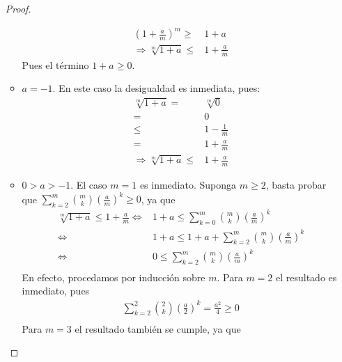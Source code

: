 \documentclass[12pt]{article}
\begin{document}
\begin{enumerate}
\begin{proof}
\begin{itemize}
\begin{equation*}
                \begin{split}
                    \left(1+\frac{a}{m}\right)^m\geq&1+a\\
                    \Rightarrow \sqrt[m]{1+a}\leq&1+\frac{a}{m}
                \end{split}
            \end{equation*}
            Pues el término $1+a\geq0$.
            \item $a=-1$. En este caso la desigualdad es inmediata, pues:
            \begin{equation*}
                \begin{split}
                    \sqrt[m]{1+a}=&\sqrt[m]{0}\\
                    =&0\\
                    \leq& 1-\frac{1}{m}\\
                    =&1+\frac{a}{m}\\
                    \Rightarrow\sqrt[m]{1+a}\leq&1+\frac{a}{m}
                \end{split}
            \end{equation*}
            \item $0> a> -1$. El caso $m=1$ es inmediato. Suponga $m\geq2$, basta probar que $\sum_{k=2}^{m}{m \choose k}\left(\frac{a}{m}\right)^k\geq 0$, ya que
            \begin{equation*}
                \begin{split}
                    \sqrt[m]{1+a}\leq 1+\frac{a}{m}\iff&1+a\leq \sum_{k=0}^{m}{m \choose k}\left(\frac{a}{m}\right)^k\\
                    \iff&1+a\leq1+a+\sum_{k=2}^{m}{m \choose k}\left(\frac{a}{m}\right)^k\\
                    \iff&0\leq\sum_{k=2}^{m}{m \choose k}\left(\frac{a}{m}\right)^k\\
                \end{split}
            \end{equation*}
            En efecto, procedamos por inducción sobre $m$. Para $m=2$ el resultado es inmediato, pues
            \begin{equation*}
                \begin{split}
                    \sum_{k=2}^{2}{2 \choose k}\left(\frac{a}{2}\right)^k=\frac{a^2}{4}\geq0\\
                \end{split}
            \end{equation*}
            Para $m=3$ el resultado también se cumple, ya que

\end{itemize}
\end{proof}
\end{enumerate}
\end{document}
